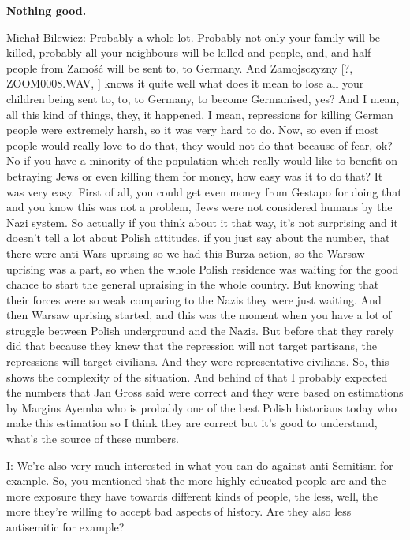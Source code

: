 \textbf{Nothing good.}

Michał Bilewicz: Probably a whole lot. Probably not only your family will be killed, probably all your neighbours will be killed and people, and, and half people from Zamość will be sent to, to Germany. And Zamojsczyzny [?, ZOOM0008.WAV, ] knows it quite well what does it mean to lose all your children being sent to, to, to Germany, to become Germanised, yes? And I mean, all this kind of things, they, it happened, I mean, repressions for killing German people were extremely harsh, so it was very hard to do. Now, so even if most people would really love to do that, they would not do that because of fear, ok? No if you have a minority of the population which really would like to benefit on betraying Jews or even killing them for money, how easy was it to do that? It was very easy. First of all, you could get even money from Gestapo for doing that and you know this was not a problem, Jews were not considered humans by the Nazi system. So actually if you think about it that way, it’s not surprising and it doesn’t tell a lot about Polish attitudes, if you just say about the number, that there were anti-Wars uprising so we had this Burza action, so the Warsaw uprising was a part, so when the whole Polish residence was waiting for the good chance to start the general upraising in the whole country. But knowing that their forces were so weak comparing to the Nazis they were just waiting. And then Warsaw uprising started, and this was the moment when you have a lot of struggle between Polish underground and the Nazis. But before that they rarely did that because they knew that the repression will not target partisans, the repressions will target civilians. And they were representative civilians. So, this shows the complexity of the situation. And behind of that I probably expected the numbers that Jan Gross said were correct and they were based on estimations by Margins Ayemba who is probably one of the best Polish historians today who make this estimation so I think they are correct but it’s good to understand, what’s the source of these numbers.  

I: We’re also very much interested in what you can do against anti-Semitism for example. So, you mentioned that the more highly educated people are and the more exposure they have towards different kinds of people, the less, well, the more they’re willing to accept bad aspects of history. Are they also less antisemitic for example? 

